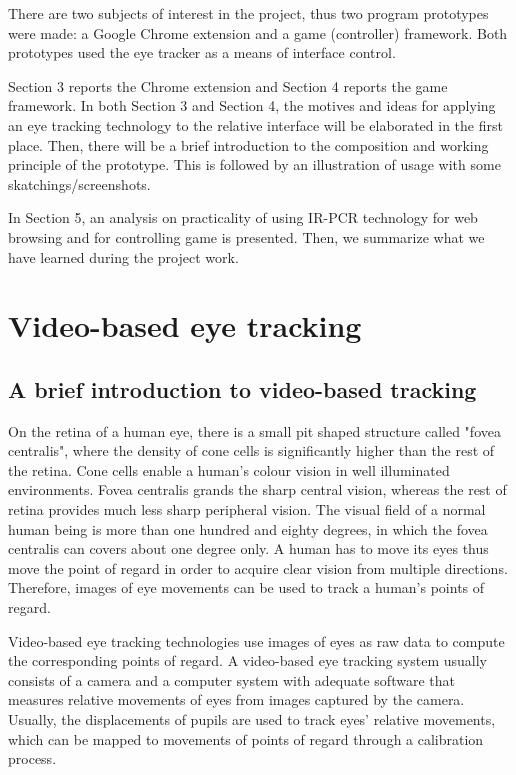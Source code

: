 \documentclass[english]{tktltiki}
\begin{document}
There are two subjects of interest in the project, thus two program prototypes were made: a Google Chrome extension and a game (controller) framework.  Both prototypes used the eye tracker as a means of interface control.

Section 3 reports the Chrome extension and Section 4 reports the game framework. In both Section 3 and Section 4, the motives and ideas for applying an eye tracking technology to the relative interface will be elaborated in the first place. Then, there will be a brief introduction to the composition and working principle of the prototype. This is followed by an illustration of usage with some skatchings/screenshots. 

In Section 5,  an analysis on practicality of using IR-PCR technology for web browsing and for controlling game is presented. Then, we summarize what we have learned during the project work.


\section{Video-based eye tracking}

\subsection{A brief introduction to video-based tracking}

On the retina of a human eye, there is a small pit shaped structure called "fovea centralis", where the density of cone cells is significantly higher than the rest of the retina. Cone cells enable a human's colour vision in well illuminated environments. Fovea centralis grands the sharp central vision, whereas the rest of retina provides much less sharp peripheral vision. The visual field of a normal human being is more than one hundred and eighty degrees, in which the fovea centralis can covers about one degree only. A human has to move its eyes thus move the point of regard in order to acquire clear vision from multiple directions. Therefore, images of eye movements can be used to track a human's points of regard.

Video-based eye tracking technologies use images of eyes as raw data to compute the corresponding points of regard. A video-based eye tracking system usually consists of a camera and a computer system with adequate software that measures relative movements of eyes from images captured by the camera. Usually, the displacements of pupils are used to track eyes' relative movements, which can be mapped to movements of points of regard through a calibration process. 
\end{document}
